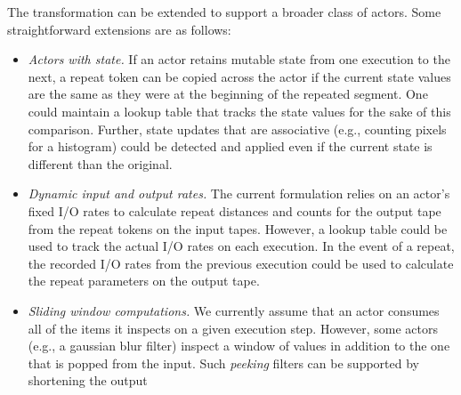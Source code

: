 The transformation can be extended to support a broader class of
actors.  Some straightforward extensions are as follows:
\begin{itemize}

\item {\it Actors with state.}  If an actor retains mutable state from
one execution to the next, a repeat token can be copied across the
actor if the current state values are the same as they were at the
beginning of the repeated segment.  One could maintain a lookup table
that tracks the state values for the sake of this comparison.
Further, state updates that are associative (e.g., counting pixels for
a histogram) could be detected and applied even if the current state
is different than the original.

\item {\it Dynamic input and output rates.}  The current formulation
relies on an actor's fixed I/O rates to calculate repeat distances and
counts for the output tape from the repeat tokens on the input tapes.
However, a lookup table could be used to track the actual I/O rates on
each execution.  In the event of a repeat, the recorded I/O rates from
the previous execution could be used to calculate the repeat
parameters on the output tape.

\item {\it Sliding window computations.}  We currently assume that an
actor consumes all of the items it inspects on a given execution step.
However, some actors (e.g., a gaussian blur filter) inspect a window
of values in addition to the one that is popped from the input.  Such
{\it peeking} filters can be supported by shortening the output

\end{itemize}